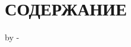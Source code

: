 \renewcommand{\contentsname}{СОДЕРЖАНИЕ}

\chapter*{\contentsname}

\begingroup
\advance\topskip by -\dimexpr 0.8mm\relax
\makeatletter
{}
\makeatother
\endgroup
